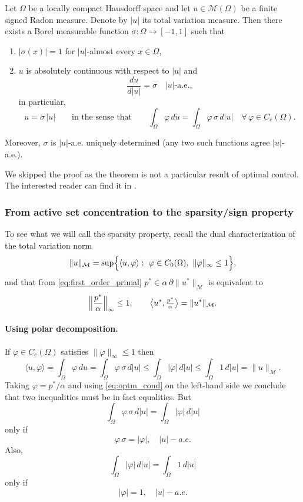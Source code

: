 \documentclass[11pt,a4paper]{article}
\begin{document}
\begin{theorem}\label{thm:polar_decomp_measure}
Let $\Omega$ be a locally compact Hausdorff space and let $u\in\mathcal M(\Omega)$ be a finite signed Radon
measure. Denote by $|u|$ its total variation measure. Then there exists a Borel
measurable function $\sigma:\Omega\to[-1,1]$ such that
\begin{enumerate}
\item $|\sigma(x)|=1$ for $|u|$-almost every $x\in\Omega$,
\item $u$ is absolutely continuous with respect to $|u|$ and
      \[
      \frac{du}{d|u|}=\sigma \quad\text{$|u|$-a.e.},
      \]
      in particular,
      \[
      u = \sigma\,|u| \qquad\text{in the sense that}\qquad
      \int_\Omega \varphi\,du = \int_\Omega \varphi\,\sigma\,d|u|
      \quad\forall\,\varphi\in C_c(\Omega).
      \]
\end{enumerate}
Moreover, $\sigma$ is $|u|$-a.e. uniquely determined (any two such functions agree $|u|$-a.e.).
\end{theorem}

\begin{remark}
      We skipped the proof as the theorem is not a particular result of optimal control. The interested reader can find it in \cite{Bogachev2007MeasureTheory}.
\end{remark}

\subsubsection*{From active set concentration to the sparsity/sign property }
To see what we will call the sparsity property, recall the dual characterization of the total variation norm
\[
\|u\|_{\mathcal M}=\sup\Bigl\{\langle u,\varphi\rangle:\ \varphi\in C_0(\Omega),\ \|\varphi\|_\infty\le 1\Bigr\},
\]
and that from \eqref{eq:first_order_primal} $p^*\in \alpha\,\partial\|u^*\|_{\mathcal M}$ is equivalent to
\[
\Bigl\|\frac{p^*}{\alpha}\Bigr\|_\infty\le 1,
\qquad
\bigl\langle u^*,\tfrac{p^*}{\alpha}\bigr\rangle=\|u^*\|_{\mathcal M} \label{eq:optm_cond}.
\]

\paragraph{Using polar decomposition.}
If $\varphi\in C_c(\Omega)$ satisfies $\|\varphi\|_\infty\le 1$ then
\[
\langle u,\varphi\rangle=\int_\Omega \varphi\,du=\int_\Omega \varphi\,\sigma\,d|u|
\le \int_\Omega |\varphi|\,d|u|\le \int_\Omega 1\,d|u|=\|u\|_{\mathcal M}.
\]
Taking $\varphi = p^*/\alpha$ and using \ref{eq:optm_cond} on the left-hand side we conclude that two inequalities must be in fact equalities. But 
\[
\int_\Omega \varphi\,\sigma\,d|u|
= \int_\Omega |\varphi|\,d|u|
\]
only if
\[
\varphi\,\sigma = |\varphi|, \quad |u|-a.e. \label{eq:sigma_cond}
\]
Also,
\[
\int_\Omega |\varphi|\,d|u| = \int_\Omega 1\,d|u| \label{eq:u_cond}
\]
only if
\[
|\varphi| = 1, \quad |u|-a.e.
\]
\end{document}

